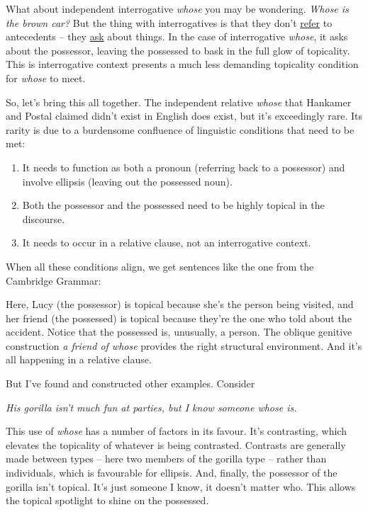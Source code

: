 What about independent interrogative \textit{whose} you may be wondering. \textit{Whose is the brown car?} But the thing with interrogatives is that they don't \uline{refer} to antecedents -- they \uline{ask} about things. In the case of interrogative \textit{whose}, it asks about the possessor, leaving the possessed to bask in the full glow of topicality. This is interrogative context presents a much less demanding topicality condition for \textit{whose} to meet.

So, let's bring this all together. The independent relative \textit{whose} that Hankamer and Postal claimed didn't exist in English does exist, but it's exceedingly rare. Its rarity is due to a burdensome confluence of linguistic conditions that need to be met:

\begin{enumerate}
    \item It needs to function as both a pronoun (referring back to a possessor) and involve ellipsis (leaving out the possessed noun).
    \item Both the possessor and the possessed need to be highly topical in the discourse.
    \item It needs to occur in a relative clause, not an interrogative context.    
\end{enumerate}


When all these conditions align, we get sentences like the one from the Cambridge Grammar:

\z

Here, Lucy (the possessor) is topical because she's the person being visited, and her friend (the possessed) is topical because they're the one who told about the accident. Notice that the possessed is, unusually, a person. The oblique genitive construction \textit{a friend of whose} provides the right structural environment. And it's all happening in a relative clause.

But I've found and constructed other examples. Consider

\ea \textit{His gorilla isn't much fun at parties, but I know someone whose is.}
\z

This use of \textit{whose} has a number of factors in its favour. It's contrasting, which elevates the topicality of whatever is being contrasted. Contrasts are generally made between types -- here two members of the gorilla type -- rather than individuals, which is favourable for ellipsis. And, finally, the possessor of the gorilla isn't topical. It's just someone I know, it doesn't matter who. This allows the topical spotlight to shine on the possessed.

